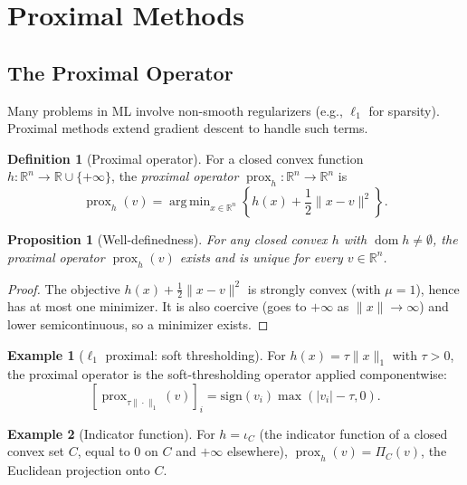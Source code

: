 \documentclass[11pt,a4paper]{article}
\theoremstyle{definition}
\newtheorem{definition}{Definition}[section]
\newtheorem{example}{Example}[section]
\theoremstyle{plain}
\newtheorem{proposition}[theorem]{Proposition}
\theoremstyle{remark}
\newcommand{\R}{\mathbb{R}}
\DeclareMathOperator{\dom}{dom}
\DeclareMathOperator{\prox}{prox}
\DeclareMathOperator*{\argmin}{arg\,min}
\begin{document}
\section{Proximal Methods}\label{sec:proximal}

\subsection{The Proximal Operator}

Many problems in ML involve non-smooth regularizers (e.g., $\ell_1$ for
sparsity). Proximal methods extend gradient descent to handle such terms.

\begin{definition}[Proximal operator]\label{def:prox}
For a closed convex function $h : \R^n \to \R \cup \{+\infty\}$, the
\emph{proximal operator} $\prox_h : \R^n \to \R^n$ is
\begin{equation}\label{eq:prox}
  \prox_h(v) = \argmin_{x \in \R^n} \left\{h(x) + \frac{1}{2}\|x - v\|^2\right\}.
\end{equation}
\end{definition}

\begin{proposition}[Well-definedness]\label{prop:prox-well}
For any closed convex $h$ with $\dom h \ne \emptyset$, the proximal operator
$\prox_h(v)$ exists and is unique for every $v \in \R^n$.
\end{proposition}

\begin{proof}
The objective $h(x) + \frac{1}{2}\|x - v\|^2$ is strongly convex (with
$\mu = 1$), hence has at most one minimizer. It is also coercive (goes to
$+\infty$ as $\|x\| \to \infty$) and lower semicontinuous, so a minimizer
exists.
\end{proof}

\begin{example}[$\ell_1$ proximal: soft thresholding]\label{ex:soft-thresh}
For $h(x) = \tau \|x\|_1$ with $\tau > 0$, the proximal operator is the
soft-thresholding operator applied componentwise:
\[
  [\prox_{\tau\|\cdot\|_1}(v)]_i = \text{sign}(v_i)\max(|v_i| - \tau, 0).
\]
\end{example}

\begin{example}[Indicator function]\label{ex:indicator-prox}
For $h = \iota_C$ (the indicator function of a closed convex set $C$, equal to
$0$ on $C$ and $+\infty$ elsewhere), $\prox_h(v) = \Pi_C(v)$, the Euclidean
projection onto $C$.
\end{example}
\end{document}
